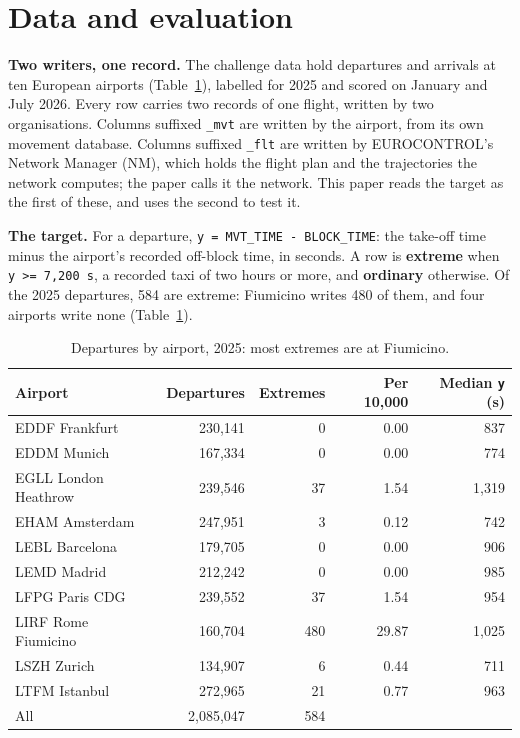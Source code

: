 \documentclass[
  manuscript=article,
  layout=preprint,
  year=2026,
  volume=x,
]{extra/joas}
\begin{document}
\section{Data and evaluation}\label{sec:3}

\textbf{Two writers, one record.} The challenge data hold departures and arrivals at ten European airports (Table~\ref{tab:2}), labelled for 2025 and scored on January and July 2026. Every row carries two records of one flight, written by two organisations. Columns suffixed \texttt{\_mvt} are written by the airport, from its own movement database. Columns suffixed \texttt{\_flt} are written by EUROCONTROL's Network Manager (NM), which holds the flight plan and the trajectories the network computes; the paper calls it the network. This paper reads the target as the first of these, and uses the second to test it.

\textbf{The target.} For a departure, \texttt{y\ =\ MVT\_TIME\ -\ BLOCK\_TIME}: the take-off time minus the airport's recorded off-block time, in seconds. A row is \textbf{extreme} when \texttt{y\ \textgreater{}=\ 7,200\ s}, a recorded taxi of two hours or more, and \textbf{ordinary} otherwise. Of the 2025 departures, 584 are extreme: Fiumicino writes 480 of them, and four airports write none (Table~\ref{tab:2}).

\begin{table}[htbp!]
  \centering
  \small
  \setlength{\tabcolsep}{5pt}\renewcommand{\arraystretch}{1.15}
  \caption{Departures by airport, 2025: most extremes are at Fiumicino.}
  \label{tab:2}
  \begin{tabular*}{\linewidth}{@{\extracolsep{\fill}}lrrrr}
  \toprule
  \textbf{Airport} & \textbf{Departures} & \textbf{Extremes} & \textbf{Per 10,000} & \textbf{Median \texttt{y} (s)} \\
  \midrule
  EDDF Frankfurt & 230,141 & 0 & 0.00 & 837 \\
  EDDM Munich & 167,334 & 0 & 0.00 & 774 \\
  EGLL London Heathrow & 239,546 & 37 & 1.54 & 1,319 \\
  EHAM Amsterdam & 247,951 & 3 & 0.12 & 742 \\
  LEBL Barcelona & 179,705 & 0 & 0.00 & 906 \\
  LEMD Madrid & 212,242 & 0 & 0.00 & 985 \\
  LFPG Paris CDG & 239,552 & 37 & 1.54 & 954 \\
  LIRF Rome Fiumicino & 160,704 & \cellcolor{recordtint}480 & \cellcolor{recordtint}29.87 & 1,025 \\
  LSZH Zurich & 134,907 & 6 & 0.44 & 711 \\
  LTFM Istanbul & 272,965 & 21 & 0.77 & 963 \\
  \midrule
  All & 2,085,047 & 584 &  &  \\
  \bottomrule
  \end{tabular*}
\end{table}
\end{document}
